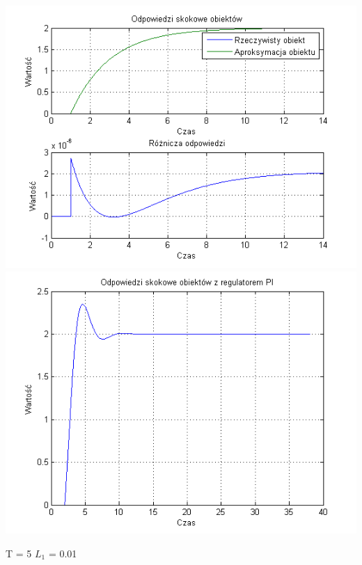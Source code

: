 \documentclass[10pt,a4paper]{article}
\begin{document}
\begin{center}
\includegraphics[scale=1]{images/jeden/skrypt_187.png}\\
\includegraphics[scale=1]{images/jeden/skrypt_188.png}\\
\end{center}
\newpage
T = 5
$L_1$ = 0.01
\end{document}

